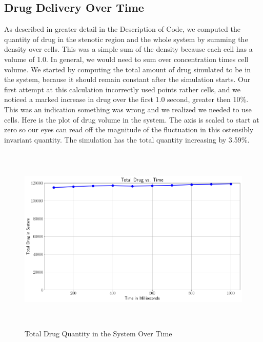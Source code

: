 \documentclass[11pt]{article} %
\begin{document}
\subsection{Drug Delivery Over Time}
As described in greater detail in the Description of Code, we computed the quantity of drug
in the stenotic region and the whole system by summing the density over cells.
This was a simple sum of the density because each cell has a volume of 1.0.
In general, we would need to sum over concentration times cell volume.
We started by computing the total amount of drug simulated to be in the system,
because it should remain constant after the simulation starts.
Our first attempt at this calculation incorrectly used points rather cells, and we noticed
 a marked increase in drug over the first 1.0 second, greater then 10\%.
This was an indication something was wrong and we realized we needed to use cells.
Here is the plot of drug volume in the system.  
The axis is scaled to start at zero so our eyes can read off the magnitude of the fluctuation
in this ostensibly invariant quantity.  
The simulation has the total quantity increasing by 3.59\%.
\begin{figure}[H]
\centering
\includegraphics[width=\linewidth,height=9cm]{drug_tot.png}
\caption{Total Drug Quantity in the System Over Time}
\end{figure}
\end{document}
